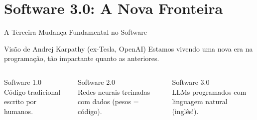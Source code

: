 \documentclass[aspectratio=169,12pt]{beamer}
\begin{document}

\section{Software 3.0: A Nova Fronteira}

\begin{frame}{A Terceira Mudança Fundamental no Software}
    \begin{block}{Visão de Andrej Karpathy (ex-Tesla, OpenAI)}
        \centering
        Estamos vivendo uma nova era na programação, tão impactante quanto as anteriores.
    \end{block}
    
    \begin{columns}[T]
        \begin{column}{0.33\textwidth}
            \begin{block}{Software 1.0}
                \faCode\\
                Código tradicional escrito por humanos.
            \end{block}
        \end{column}
        \begin{column}{0.33\textwidth}
            \begin{block}{Software 2.0}
                \faSitemap\\
                Redes neurais treinadas com dados (pesos = código).
            \end{block}
        \end{column}
        \begin{column}{0.33\textwidth}
            \begin{exampleblock}{Software 3.0}
                \faComments\\
                LLMs programados com linguagem natural (inglês!).
            \end{exampleblock}
        \end{column}
    \end{columns}
\end{frame}
\end{document}
